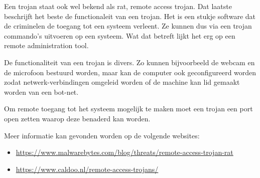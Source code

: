 Een trojan staat ook wel bekend als rat, remote access trojan. Dat laatste beschrijft het beste de functionaleit van een trojan. Het is een stukje software dat de criminelen de toegang tot een systeem verleent. Ze kunnen dus via een trojan commando's uitvoeren op een systeem. Wat dat betreft lijkt het erg op een remote administration tool.

De functionaliteit van een trojan is divers. Zo kunnen bijvoorbeeld de webcam en de microfoon bestuurd worden, maar kan de computer ook geconfigureerd worden zodat netwerk-verbindingen omgeleid worden of de machine kan lid gemaakt worden van een bot-net.

Om remote toegang tot het systeem mogelijk te maken moet een trojan een port open zetten waarop deze benaderd kan worden.

Meer informatie kan gevonden worden op de volgende websites:
\begin{itemize}
\item \url{https://www.malwarebytes.com/blog/threats/remote-access-trojan-rat}
\item \url{https://www.caldoo.nl/remote-access-trojans/}
\end{itemize}

